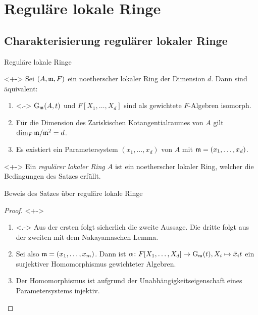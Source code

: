 \section{Reguläre lokale Ringe}

\subsection{Charakterisierung regulärer lokaler Ringe}

\begin{frame}{Reguläre lokale Ringe}
	\begin{theorem}<+->
		Sei \((A, \mathfrak{m}, F)\) ein noetherscher lokaler Ring der Dimension \(d\). Dann sind äquivalent:
		\begin{enumerate}[<+->]
		\item<.->
			\(\operatorname{G}_{\mathfrak{m}}(A, t)\) und \(F[X_1, \dotsc, X_d]\) sind als gewichtete \(F\)-Algebren isomorph.
		\item
			Für die Dimension des Zariskischen Kotangentialraumes von \(A\) gilt \(\dim_F \mathfrak{m}/\mathfrak{m}^2 = d\).
		\item
			Es existiert ein Parametersystem \((x_1, \dotsc, x_d)\) von \(A\) mit \(\mathfrak{m} = (x_1, \dotsc, x_d)\).
		\end{enumerate}
	\end{theorem}
	\begin{visibleenv}<+->
		Ein \emph{regulärer lokaler Ring \(A\)} ist ein noetherscher lokaler Ring, welcher die Bedingungen
		des Satzes erfüllt.
	\end{visibleenv}
\end{frame}

\begin{frame}{Beweis des Satzes über reguläre lokale Ringe}
	\begin{proof}<+->
		\begin{enumerate}[<+->]
		\item<.->
			Aus der ersten folgt sicherlich die zweite Aussage. Die dritte folgt aus der zweiten
			mit dem Nakayamaschen Lemma.
		\item
			Sei also \(\mathfrak{m} = (x_1, \dotsc, x_m)\). Dann ist \(\alpha\colon F[X_1, \dotsc, X_d] \to
			\operatorname{G}_{\mathfrak{m}}(t), X_i \mapsto \bar x_i t\) ein surjektiver Homomorphismus gewichteter
			Algebren.
		\item
			Der Homomorphismus ist aufgrund der Unabhängigkeitseigenschaft eines Parametersystems injektiv.
			\qedhere
		\end{enumerate}
	\end{proof}
\end{frame}

